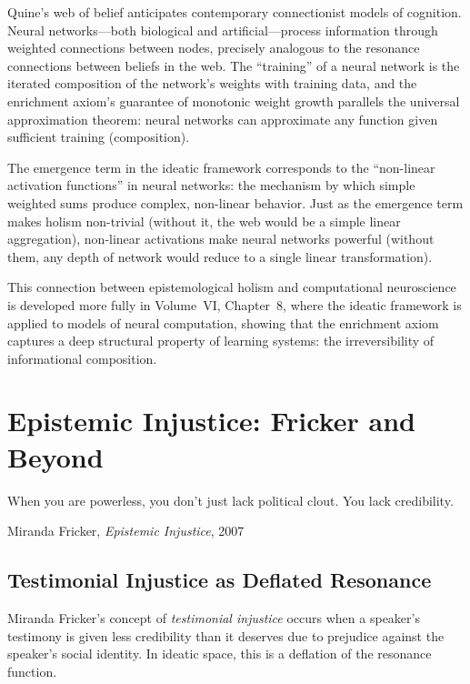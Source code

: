 \begin{remark}
Quine's web of belief anticipates contemporary connectionist models of cognition.
Neural networks---both biological and artificial---process information through
weighted connections between nodes, precisely analogous to the resonance
connections between beliefs in the web. The ``training'' of a neural network
is the iterated composition of the network's weights with training data, and
the enrichment axiom's guarantee of monotonic weight growth parallels the
universal approximation theorem: neural networks can approximate any function
given sufficient training (composition).

The emergence term in the ideatic framework corresponds to the ``non-linear
activation functions'' in neural networks: the mechanism by which simple
weighted sums produce complex, non-linear behavior. Just as the emergence
term makes holism non-trivial (without it, the web would be a simple
linear aggregation), non-linear activations make neural networks powerful
(without them, any depth of network would reduce to a single linear
transformation).

This connection between epistemological holism and computational neuroscience
is developed more fully in Volume~VI, Chapter~8, where the ideatic framework
is applied to models of neural computation, showing that the enrichment axiom
captures a deep structural property of learning systems: the irreversibility
of informational composition.
\end{remark}



\chapter{Epistemic Injustice: Fricker and Beyond}
\label{ch:epistemic-injustice}

\epigraph{When you are powerless, you don't just lack political clout. You lack credibility.}{Miranda Fricker, \textit{Epistemic Injustice}, 2007}

\section{Testimonial Injustice as Deflated Resonance}

Miranda Fricker's concept of \emph{testimonial injustice} occurs when a
speaker's testimony is given less credibility than it deserves due to
prejudice against the speaker's social identity. In ideatic space, this is
a deflation of the resonance function.

